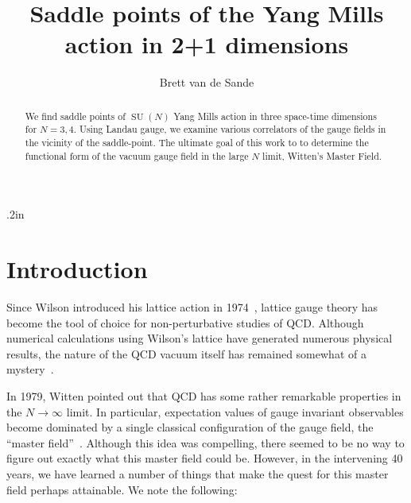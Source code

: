 \documentclass[preprint,aps,prd]{revtex4-2}
\DeclareMathOperator{\SU}{SU}
\begin{document}
\title{Saddle points of the Yang Mills action in 2+1 dimensions}


\author{Brett van de Sande}
\noaffiliation

\begin{abstract}
  We find saddle points of $\SU(N)$ Yang Mills action in three
  space-time dimensions for $N=3,4$.
  Using Landau gauge, we examine various correlators of the gauge fields
  in the vicinity of the saddle-point.
  The ultimate goal of
  this work to to determine the functional form of the vacuum gauge
  field in the large $N$ limit, Witten's Master Field.
\end{abstract}

\maketitle

\baselineskip .2in

\section{Introduction}
\label{intro}

Since Wilson introduced his lattice action in 1974~\cite{wilson_confinement_1974},
lattice gauge theory has become the tool of choice for
non-perturbative studies of QCD.  Although numerical
calculations using Wilson's lattice have generated numerous
physical results, the nature of the QCD vacuum itself
has remained somewhat of a mystery~\cite{brambilla_qcd_2014}.


In 1979, Witten pointed out that QCD has some rather remarkable
properties in the $N \to \infty$ limit.  In particular,
expectation values of gauge invariant observables become dominated by a single
classical configuration of the gauge field, the
``master field''~\cite{witten_1/n_1980}.
Although this idea was compelling, there seemed to be no
way to figure out exactly what this master field could be.
However, in the intervening 40 years, we have learned a number
of things that make the quest for this master field perhaps
attainable.  We note the following:
\end{document}
